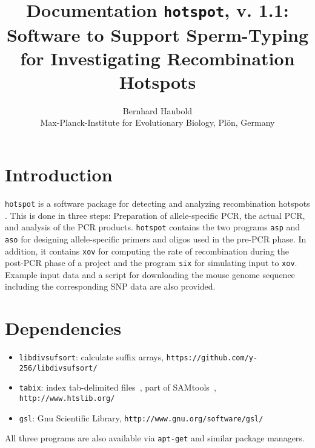 \documentclass{article}
\newcommand{\bi}{\begin{itemize}}
\newcommand{\ei}{\end{itemize}}
\newcommand{\I}{\item}
\newcommand{\ty}{\texttt}
\newcommand{\version}{1.1}
\begin{document}
\title{Documentation \ty{hotspot}, v. \version: Software to Support Sperm-Typing for
Investigating Recombination Hotspots}
\author{Bernhard Haubold\\\small Max-Planck-Institute for Evolutionary Biology, Pl\"on, Germany}
\maketitle
\section{Introduction}
\ty{hotspot} is a software package for detecting and analyzing
recombination hotspots \cite{ode16:hot}. This is done in three steps:
Preparation of allele-specific PCR, the actual PCR, and analysis of
the PCR products. \ty{hotspot} contains the two programs \ty{asp} and \ty{aso} for designing
allele-specific primers and oligos used in the pre-PCR phase. In
addition, it contains \ty{xov} for computing the rate of recombination
during the post-PCR phase of a project and the program \ty{six} for simulating input to \ty{xov}. Example input data and a script for downloading the mouse
genome sequence including the corresponding SNP data are also provided.

\section{Dependencies}
\bi
\I \ty{libdivsufsort}: calculate suffix arrays, \ty{https://github.com/y-256/libdivsufsort/}
\I \ty{tabix}: index tab-delimited files~\cite{li10:tab}, part of SAMtools~\cite{li09:seq},
\ty{http://www.htslib.org/}
\I \ty{gsl}: Gnu Scientific Library, \ty{http://www.gnu.org/software/gsl/}
\ei
All three programs are also available via \ty{apt-get} and similar
package managers.
\end{document}

